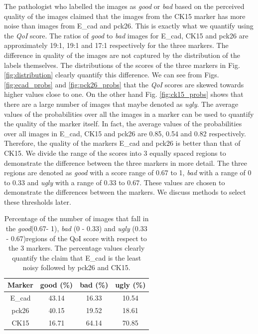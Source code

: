 The pathologist who labelled the images as \textit{good} or \textit{bad} based on the perceived quality of the images claimed that the images from the CK15 marker has more noise than images from E\_cad and pck26. This is exactly what we quantify using the \textit{QoI} score. The ratios of \textit{good} to \textit{bad} images for E\_cad, CK15 and pck26 are approximately 19:1, 19:1 and 17:1 respectively for the three markers. The difference in quality of the images are not captured by the distribution of the labels themselves. The distributions of the scores of the three markers in Fig. \ref{fig:distribution} clearly quantify this difference. We can see from Figs. \ref{fig:ecad_probs} and \ref{fig:pck26_probs} that the \textit{QoI} scores are skewed towards higher values close to one. On the other hand Fig. \ref{fig:ck15_probs} shows that there are a large number of images that maybe denoted as \textit{ugly}. The average values of the probabilities over all the images in a marker can be used to quantify the quality of the marker itself. In fact, the average values of the probabilities over all images in E\_cad, CK15 and pck26 are 0.85, 0.54 and 0.82 respectively.  Therefore, the quality of the markers E\_cad and pck26 is better than that of CK15. We divide the range of the scores into 3 equally spaced regions to demonstrate the difference between the three markers in more detail. The three regions are denoted as \textit{good} with a score range of 0.67 to 1, \textit{bad} with a range of 0 to 0.33 and \textit{ugly} with a range of 0.33 to 0.67. These values are chosen to demonstrate the differences between the markers. We discuss methods to select these thresholds later.

\begin{table}[ht!]
\centering
\caption{Percentage of the number of images that fall in the \textit{good}(0.67- 1), \textit{bad} (0 - 0.33) and \textit{ugly} (0.33 - 0.67)regions of the QoI score with respect to the 3 markers. The percentage values clearly quantify the claim that E\_cad is the least noisy followed by pck26 and CK15.}
\begin{tabular}{ |c|c|c|c|} 
 \hline
\textbf{Marker} & \textbf{good} (\%)& \textbf{bad} (\%) & \textbf{ugly} (\%)\\ 
 \hline
E\_cad & 43.14 & 16.33 & 10.54\\
 \hline
pck26 & 40.15 & 19.52 & 18.61\\
 \hline
CK15 & 16.71 & 64.14 & 70.85\\
 \hline
 \end{tabular}
\label{table:scores}
\end{table}


